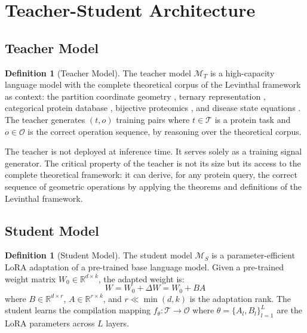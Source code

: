 \documentclass[11pt,twocolumn,a4paper]{article}
\theoremstyle{definition}
\newtheorem{definition}[theorem]{Definition}
\theoremstyle{remark}
\newcommand{\R}{\mathbb{R}}
\newcommand{\model}{\mathcal{M}}
\newcommand{\params}{\theta}
\newcommand{\taskspace}{\mathcal{T}}
\newcommand{\opspace}{\mathcal{O}}
\begin{document}
\section{Teacher-Student Architecture}
\label{sec:teacher_student}

\subsection{Teacher Model}

\begin{definition}[Teacher Model]
\label{def:teacher}
The teacher model $\model_T$ is a high-capacity language model with the complete theoretical corpus of the Levinthal framework as context: the partition coordinate geometry \citep{sachikonye2025a}, ternary representation \citep{sachikonye2025d}, categorical protein database \citep{sachikonye2025c}, bijective proteomics \citep{sachikonye2025f}, and disease state equations \citep{sachikonye2025e}. The teacher generates $(t, o)$ training pairs where $t \in \taskspace$ is a protein task and $o \in \opspace$ is the correct operation sequence, by reasoning over the theoretical corpus.
\end{definition}

The teacher is not deployed at inference time. It serves solely as a training signal generator. The critical property of the teacher is not its size but its access to the complete theoretical framework: it can derive, for any protein query, the correct sequence of geometric operations by applying the theorems and definitions of the Levinthal framework.

\subsection{Student Model}

\begin{definition}[Student Model]
\label{def:student}
The student model $\model_S$ is a parameter-efficient LoRA adaptation \citep{hu2022} of a pre-trained base language model. Given a pre-trained weight matrix $W_0 \in \R^{d \times k}$, the adapted weight is:
\begin{equation}
W = W_0 + \Delta W = W_0 + BA
\end{equation}
where $B \in \R^{d \times r}$, $A \in \R^{r \times k}$, and $r \ll \min(d, k)$ is the adaptation rank. The student learns the compilation mapping $f_\params: \taskspace \to \opspace$ where $\params = \{A_l, B_l\}_{l=1}^{L}$ are the LoRA parameters across $L$ layers.
\end{definition}
\end{document}
